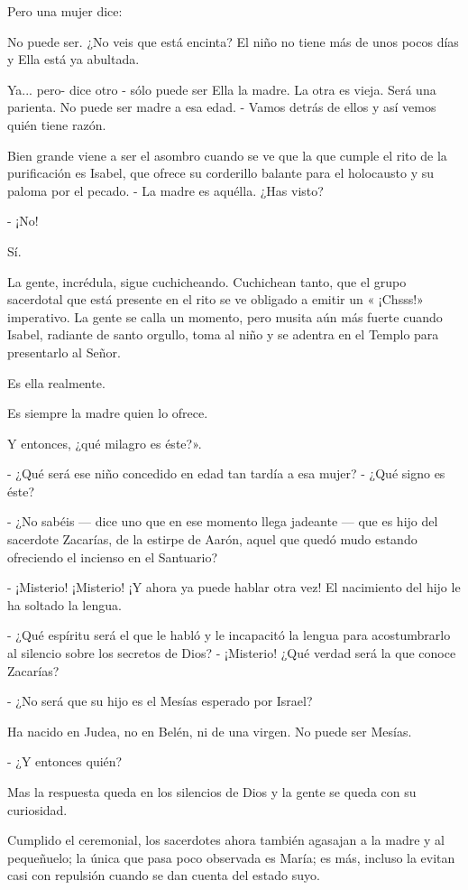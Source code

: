 \documentclass[12pt, twoside, openright]{book} %
\begin{document}
Pero una mujer dice: 

No puede ser. ¿No veis que está encinta? El niño no tiene más de unos pocos días y Ella está ya abultada. 

Ya... pero- dice otro - sólo puede ser Ella la madre. La otra es vieja. Será una parienta. No puede ser madre a esa edad. - Vamos detrás de ellos y así vemos quién tiene razón. 

Bien grande viene a ser el asombro cuando se ve que la que cumple el rito de la purificación es Isabel, que ofrece su corderillo balante para el holocausto y su paloma por el pecado. - La madre es aquélla. ¿Has visto? 

- ¡No! 

Sí. 

La gente, incrédula, sigue cuchicheando. Cuchichean tanto, que el grupo sacerdotal que está presente en el rito se ve obligado a emitir un « ¡Chsss!» imperativo. La gente se calla un momento, pero musita aún más fuerte cuando Isabel, radiante de santo orgullo, toma al niño y se adentra en el Templo para presentarlo al Señor. 

Es ella realmente. 

Es siempre la madre quien lo ofrece. 

Y entonces, ¿qué milagro es éste?». 

- ¿Qué será ese niño concedido en edad tan tardía a esa mujer? - ¿Qué signo es éste? 

- ¿No sabéis — dice uno que en ese momento llega jadeante — que es hijo del sacerdote Zacarías, de la estirpe de Aarón, aquel que quedó mudo estando ofreciendo el incienso en el Santuario? 

- ¡Misterio! ¡Misterio! ¡Y ahora ya puede hablar otra vez! El nacimiento del hijo le ha soltado la lengua. 

- ¿Qué espíritu será el que le habló y le incapacitó la lengua para acostumbrarlo al silencio sobre los secretos de Dios? - ¡Misterio! ¿Qué verdad será la que conoce Zacarías? 

- ¿No será que su hijo es el Mesías esperado por Israel? 

Ha nacido en Judea, no en Belén, ni de una virgen. No puede ser Mesías. 

- ¿Y entonces quién? 

Mas la respuesta queda en los silencios de Dios y la gente se queda con su curiosidad. 

Cumplido el ceremonial, los sacerdotes ahora también agasajan a la madre y al pequeñuelo; la única que pasa poco observada es María; es más, incluso la evitan casi con repulsión cuando se dan cuenta del estado suyo. 
\end{document}
